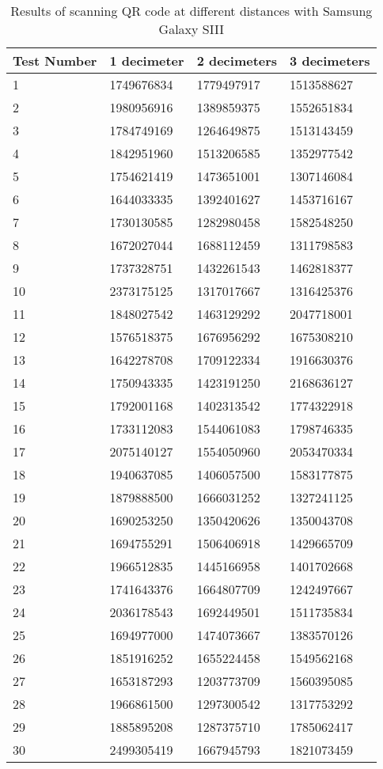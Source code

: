 	\begin{table}[ht!]
    		\caption{Results of scanning QR code at different distances with Samsung Galaxy SIII} \label{tab:distamceGoogleGlassFull}
		\centering \begin{tabularx}{\textwidth}{l|X|X|X} \hline
		\textbf{Test Number} & \textbf{1 decimeter} & \textbf{2 decimeters} & \textbf{3 decimeters} \\ \hline \hline
		
		1&	1749676834	&	1779497917	&	1513588627	\\ \hline
		2&	1980956916	&	1389859375	&	1552651834	\\ \hline
		3&	1784749169	&	1264649875	&	1513143459	\\ \hline
		4&	1842951960	&	1513206585	&	1352977542	\\ \hline
		5&	1754621419	&	1473651001	&	1307146084	\\ \hline
		6&	1644033335	&	1392401627	&	1453716167	\\ \hline
		7&	1730130585	&	1282980458	&	1582548250	\\ \hline
		8&	1672027044	&	1688112459	&	1311798583	\\ \hline
		9&	1737328751	&	1432261543	&	1462818377	\\ \hline
		10&	2373175125	&	1317017667	&	1316425376	\\ \hline
		11&	1848027542	&	1463129292	&	2047718001	\\ \hline
		12&	1576518375	&	1676956292	&	1675308210	\\ \hline
		13&	1642278708	&	1709122334	&	1916630376	\\ \hline
		14&	1750943335	&	1423191250	&	2168636127	\\ \hline
		15&	1792001168	&	1402313542	&	1774322918	\\ \hline
		16&	1733112083	&	1544061083	&	1798746335	\\ \hline
		17&	2075140127	&	1554050960	&	2053470334	\\ \hline
		18&	1940637085	&	1406057500	&	1583177875	\\ \hline
		19&	1879888500	&	1666031252	&	1327241125	\\ \hline
		20&	1690253250	&	1350420626	&	1350043708	\\ \hline
		21&	1694755291	&	1506406918	&	1429665709	\\ \hline
		22&	1966512835	&	1445166958	&	1401702668	\\ \hline
		23&	1741643376	&	1664807709	&	1242497667	\\ \hline
		24&	2036178543	&	1692449501	&	1511735834	\\ \hline
		25&	1694977000	&	1474073667	&	1383570126	\\ \hline
		26&	1851916252	&	1655224458	&	1549562168	\\ \hline
		27&	1653187293	&	1203773709	&	1560395085	\\ \hline
		28&	1966861500	&	1297300542	&	1317753292	\\ \hline
		29&	1885895208	&	1287375710	&	1785062417	\\ \hline
		30&	2499305419	&	1667945793	&	1821073459	\\ \hline

		\end{tabularx}
	\end{table}